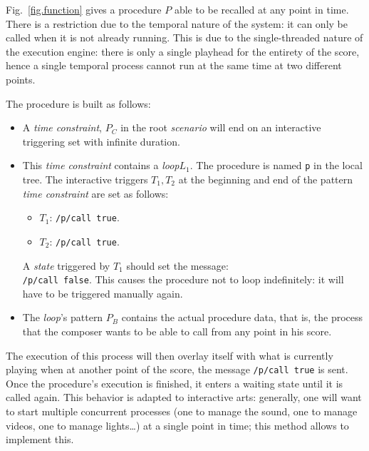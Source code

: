 \documentclass{article}
\newcommand{\scenario}{\textit{scenario}\xspace}
\newcommand{\Loop}{\textit{loop}\xspace}
\newcommand{\state}{\textit{state}\xspace}
\newcommand{\timeconstraint}{\textit{time constraint}\xspace}
\begin{document}
Fig.~\ref{fig.function} gives a 
procedure $P$ able to be recalled at any point in time.
There is a restriction due to the temporal nature of the system: 
it can only be called when it is not already running. 
This is due to the single-threaded nature of the execution engine: there is 
only a single playhead for the entirety of the score, hence a single 
temporal process cannot run at the same time at two different points.

The procedure is built as follows: 
\begin{itemize}
    \item A \timeconstraint, $P_C$ in the root \scenario will end on an interactive triggering set with infinite duration.
    \item This \timeconstraint contains a \Loop $L_1$. 
    The procedure is named \lstinline{p} in the local tree. 
    The interactive triggers $T_1, T_2$ at the beginning and end of the pattern \timeconstraint are set as follows: 
    \begin{itemize}
        \item $T_1$: \lstinline{/p/call true}.
        \item $T_2$: \lstinline{/p/call true}.
    \end{itemize}
    A \state triggered by $T_1$ should set the message:~\\
    \lstinline{/p/call false}. 
    This causes the procedure not to loop 
    indefinitely: it will have to be triggered manually again.
    \item The \Loop's pattern $P_B$ contains the actual procedure data, that is, the process that the composer wants to be able to call from any point in his score. 
\end{itemize}

The execution of this process will then overlay itself with what is currently playing when at another point of the score, 
the message \lstinline{/p/call true} is sent.
Once the procedure's execution is finished, it enters a waiting state until it is called again.
This behavior is adapted to interactive arts: generally, one will want to start multiple 
concurrent processes (one to manage the sound, one to manage videos, one to manage lights\dots) at a single point in time; this method allows to implement this.
\end{document}
